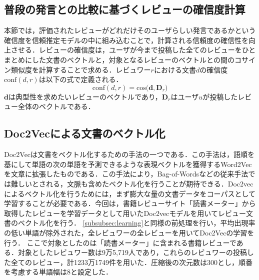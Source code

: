\documentclass[a4paper,11pt,oneside,openany]{jsbook}
\begin{document}
	\subsection{普段の発言との比較に基づくレビューの確信度計算}
\label{subsec:typ}
本節では，評価されたレビューがどれだけそのユーザらしい発言であるかという確信度を信頼推定モデルの中に組み込むことで，計算される信頼度の確信性を向上させる．レビューの確信度は，ユーザが今まで投稿した全てのレビューをひとまとめにした文書のベクトルと，対象となるレビューのベクトルとの間のコサイン類似度を計算することで求める．レビュワー$r$における文書$d$の確信度$\mathrm{conf}(d , r)$は以下の式で定義される．
\begin{equation}
\mathrm{conf}(d, r) = \mathrm{cos}\bigl(\mathbf{d}, \mathbf{D}_r\bigr)
\end{equation}
$\mathbf{d}$は典型性を求めたいレビューのベクトルであり，$\mathbf{D}_r$はユーザ$u$が投稿したレビュー全体のベクトルである．

\subsection{Doc2Vecによる文書のベクトル化}
Doc2Vecは文書をベクトル化するための手法の一つである\cite{doc2vec}．この手法は，語順を基にして単語の次の単語を予測できるような表現ベクトルを獲得するWord2Vec\cite{word2vec}を文章に拡張したものである．この手法により，Bag-of-Wordsなどの従来手法では難しいとされる，文脈も含めたベクトル化を行うことが期待できる．Doc2vecによるベクトル化を行うためには，まず膨大な量の文書データをコーパスとして学習することが必要である．今回は，書籍レビューサイト「読書メーター」から取得したレビューを学習データとして用いたDoc2vecモデルを用いてレビュー文書のベクトル化を行う．
\ref{subsubsec:learning}と同様の前処理を行い，平均出現率の低い単語が除外された，全レビュワーの全レビューを用いてDoc2Vecの学習を行う．
ここで対象としたのは「読書メーター」に含まれる書籍レビューである．対象としたレビュワー数は9万5,719人であり，これらのレビュワーの投稿した全てのレビュー，計1233万1749件を用いた．圧縮後の次元数は300とし，順番を考慮する単語幅は8と設定した．
\end{document}
